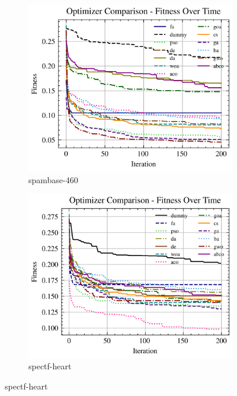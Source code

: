 \begin{figure}[htp]
    \centering
    \begin{subfigure}[htp]{0.45\textwidth}
        \includegraphics[width=\textwidth]{imagenes/fitness_charts/img/binary/spambase-460/optimizers_fitness_svc.png}
        \caption{spambase-460}
    \end{subfigure}
    \begin{subfigure}[htp]{0.45\textwidth}
        \includegraphics[width=\textwidth]{imagenes/fitness_charts/img/binary/spectf-heart/optimizers_fitness_svc.png}
        \caption{spectf-heart}
    \end{subfigure}


\end{figure}
